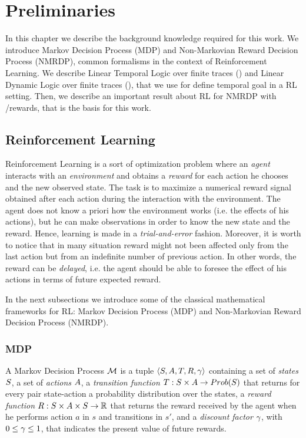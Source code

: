 \chapter{Preliminaries}
\label{preliminaries}
In this chapter we describe the background knowledge required for this work. We introduce Markov Decision Process (MDP) and Non-Markovian Reward Decision Process (NMRDP), common formalisms in the context of Reinforcement Learning. We describe Linear Temporal Logic over finite traces (\LTLf) and Linear Dynamic Logic over finite traces (\LDLf), that we use for define temporal goal in a RL setting. Then, we describe an important result about RL for NMRDP with \LTLf/\LDLf rewards, that is the basis for this work.

\section{Reinforcement Learning}
\label{RL}
Reinforcement Learning \citep{Sutton:1998:IRL:551283} is a sort of optimization problem where an \emph{agent} interacts with an \emph{environment} and obtains a \emph{reward} for each action he chooses and the new observed state. The task is to maximize a numerical reward signal obtained after each action during the interaction with the environment. The agent does not know a priori how the environment works (i.e. the effects of his actions), but he can make observations in order to know the new state and the reward. Hence, learning is made in a \emph{trial-and-error} fashion. Moreover, it is worth to notice that in many situation reward might not been affected only from the last action but from an indefinite number of previous action. In other words, the reward can be \emph{delayed}, i.e. the agent should be able to foresee the effect of his actions in terms of future expected reward. 

In the next subsections we introduce some of the classical mathematical frameworks for RL: Markov Decision Process (MDP) and Non-Markovian Reward Decision Process (NMRDP).
\subsection{MDP}
\label{MDP}

	A Markov Decision Process $\mathcal{M}$ is a tuple $\langle S, A, T, R, \gamma \rangle$ containing a set of \emph{states} $S$, a set of \emph{actions} $A$, a \emph{transition function} $T: S \times A \to Prob(S)$ that returns for every pair state-action a probability distribution over the states, a \emph{reward function} $R: S \times A \times S \to \mathbb{R}$ that returns the reward received by the agent when he performs action $a$ in $s$ and transitions in $s'$, and a \emph{discount factor} $\gamma$, with $0 \le \gamma \le 1$, that indicates the present value of future rewards.
